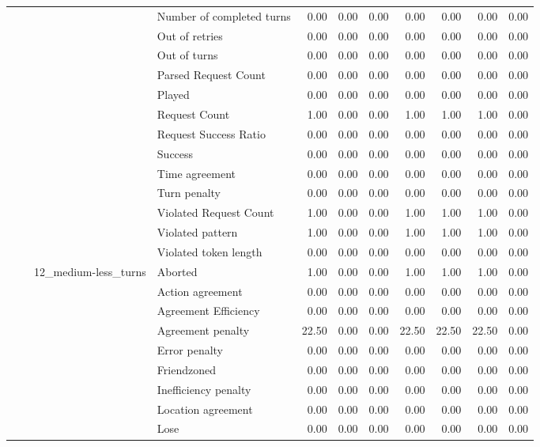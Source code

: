 \begin{tabular}{llllrrrrrrr}
 &  &  & Number of completed turns & 0.00 & 0.00 & 0.00 & 0.00 & 0.00 & 0.00 & 0.00 \\
 &  &  & Out of retries & 0.00 & 0.00 & 0.00 & 0.00 & 0.00 & 0.00 & 0.00 \\
 &  &  & Out of turns & 0.00 & 0.00 & 0.00 & 0.00 & 0.00 & 0.00 & 0.00 \\
 &  &  & Parsed Request Count & 0.00 & 0.00 & 0.00 & 0.00 & 0.00 & 0.00 & 0.00 \\
 &  &  & Played & 0.00 & 0.00 & 0.00 & 0.00 & 0.00 & 0.00 & 0.00 \\
 &  &  & Request Count & 1.00 & 0.00 & 0.00 & 1.00 & 1.00 & 1.00 & 0.00 \\
 &  &  & Request Success Ratio & 0.00 & 0.00 & 0.00 & 0.00 & 0.00 & 0.00 & 0.00 \\
 &  &  & Success & 0.00 & 0.00 & 0.00 & 0.00 & 0.00 & 0.00 & 0.00 \\
 &  &  & Time agreement & 0.00 & 0.00 & 0.00 & 0.00 & 0.00 & 0.00 & 0.00 \\
 &  &  & Turn penalty & 0.00 & 0.00 & 0.00 & 0.00 & 0.00 & 0.00 & 0.00 \\
 &  &  & Violated Request Count & 1.00 & 0.00 & 0.00 & 1.00 & 1.00 & 1.00 & 0.00 \\
 &  &  & Violated pattern & 1.00 & 0.00 & 0.00 & 1.00 & 1.00 & 1.00 & 0.00 \\
 &  &  & Violated token length & 0.00 & 0.00 & 0.00 & 0.00 & 0.00 & 0.00 & 0.00 \\
\cline{3-11}
 &  & \multirow[t]{27}{*}{12_medium-less_turns} & Aborted & 1.00 & 0.00 & 0.00 & 1.00 & 1.00 & 1.00 & 0.00 \\
 &  &  & Action agreement & 0.00 & 0.00 & 0.00 & 0.00 & 0.00 & 0.00 & 0.00 \\
 &  &  & Agreement Efficiency & 0.00 & 0.00 & 0.00 & 0.00 & 0.00 & 0.00 & 0.00 \\
 &  &  & Agreement penalty & 22.50 & 0.00 & 0.00 & 22.50 & 22.50 & 22.50 & 0.00 \\
 &  &  & Error penalty & 0.00 & 0.00 & 0.00 & 0.00 & 0.00 & 0.00 & 0.00 \\
 &  &  & Friendzoned & 0.00 & 0.00 & 0.00 & 0.00 & 0.00 & 0.00 & 0.00 \\
 &  &  & Inefficiency penalty & 0.00 & 0.00 & 0.00 & 0.00 & 0.00 & 0.00 & 0.00 \\
 &  &  & Location agreement & 0.00 & 0.00 & 0.00 & 0.00 & 0.00 & 0.00 & 0.00 \\
 &  &  & Lose & 0.00 & 0.00 & 0.00 & 0.00 & 0.00 & 0.00 & 0.00 \\

\end{tabular}
